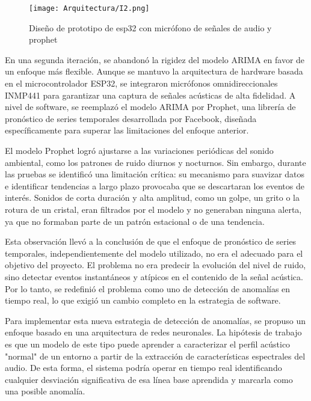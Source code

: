\begin{enumerate}
            \begin{figure}[h!]
                  \centering
                  \texttt{[image: Arquitectura/I2.png]}
                  \caption{Diseño de prototipo de esp32 con micrófono de señales de audio y prophet}
                  \label{fig:prototipo2}
            \end{figure}

            En una segunda iteración, se abandonó la rigidez del modelo ARIMA en favor de un enfoque más flexible. Aunque se mantuvo la arquitectura de hardware basada en el microcontrolador ESP32, se integraron micrófonos omnidireccionales INMP441 para garantizar una captura de señales acústicas de alta fidelidad. A nivel de software, se reemplazó el modelo ARIMA por Prophet, una librería de pronóstico de series temporales desarrollada por Facebook, diseñada específicamente para superar las limitaciones del enfoque anterior.

            El modelo Prophet logró ajustarse a las variaciones periódicas del sonido ambiental, como los patrones de ruido diurnos y nocturnos. Sin embargo, durante las pruebas se identificó una limitación crítica: su mecanismo para suavizar datos e identificar tendencias a largo plazo provocaba que se descartaran los eventos de interés. Sonidos de corta duración y alta amplitud, como un golpe, un grito o la rotura de un cristal, eran filtrados por el modelo y no generaban ninguna alerta, ya que no formaban parte de un patrón estacional o de una tendencia.

            Esta observación llevó a la conclusión de que el enfoque de pronóstico de series temporales, independientemente del modelo utilizado, no era el adecuado para el objetivo del proyecto. El problema no era predecir la evolución del nivel de ruido, sino detectar eventos instantáneos y atípicos en el contenido de la señal acústica. Por lo tanto, se redefinió el problema como uno de detección de anomalías en tiempo real, lo que exigió un cambio completo en la estrategia de software.

            Para implementar esta nueva estrategia de detección de anomalías, se propuso un enfoque basado en una arquitectura de redes neuronales. La hipótesis de trabajo es que un modelo de este tipo puede aprender a caracterizar el perfil acústico "normal" de un entorno a partir de la extracción de características espectrales del audio. De esta forma, el sistema podría operar en tiempo real identificando cualquier desviación significativa de esa línea base aprendida y marcarla como una posible anomalía.


\end{enumerate}
